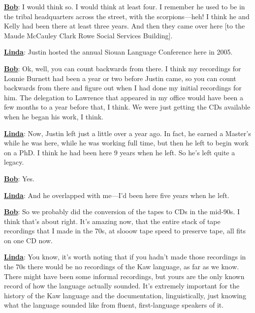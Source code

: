 \documentclass[output=paper]{LSP/langsci}
\begin{document}
\textbf{\underline{Bob}}: I would think so. I would think at least four. I remember he used to be in the tribal headquarters across the street, with the scorpions---heh! I think he and Kelly had been there at least three years. And then they came over here [to the Maude McCauley Clark Rowe Social Services Building].

\textbf{\underline{Linda}}: Justin hosted the annual Siouan Language Conference here in 2005. 

\textbf{\underline{Bob}}: Ok, well, you can count backwards from there. I think my recordings for Lonnie Burnett had been a year or two before Justin came, so you can count backwards from there and figure out when I had done my initial recordings for him. The delegation to Lawrence that appeared in my office would have been a few months to a year before that, I think. We were just getting the CDs available when he began his work, I think.

\textbf{\underline{Linda}}: Now, Justin left just a little over a year ago. In fact, he earned a Master's while he was here, while he was working full time, but then he left to begin work on a PhD. I think he had been here 9 years when he left. So he's left quite a legacy.

\textbf{\underline{Bob}}: Yes.

\textbf{\underline{Linda}}: And he overlapped with me---I'd been here five years when he left.

\textbf{\underline{Bob}}: So we probably did the conversion of the tapes to CDs in the mid-90s. I think that's about right. It's amazing now, that the entire stack of tape recordings that I made in the 70s, at slooow tape speed to preserve tape, all fits on one CD now.

\textbf{\underline{Linda}}: You know, it's worth noting that if you hadn't made those recordings in the 70s there would be no recordings of the Kaw language, as far as we know. There might have been some informal recordings, but yours are the only known record of how the language actually sounded. It's extremely important for the history of the Kaw language and the documentation, linguistically, just knowing what the language sounded like from fluent, first-language speakers of it.
\end{document}
